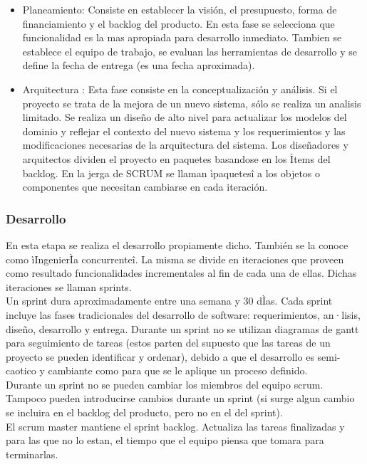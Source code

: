 \documentclass[preprint,12pt]{elsarticle}
\begin{document}
\begin{itemize}
\item Planeamiento: Consiste en establecer la visión, el presupuesto, forma de financiamiento y el backlog del producto. En esta fase se selecciona que funcionalidad es la mas apropiada para desarrollo inmediato. Tambien se establece el equipo de trabajo, se evaluan las herramientas de desarrollo y se define la fecha de entrega (es una fecha aproximada). \cite{ScrumDef}

\item Arquitectura : Esta fase consiste en la conceptualización y análisis. Si el proyecto se trata de la mejora de un nuevo sistema, sólo se realiza un analisis limitado. Se realiza un diseño de alto nivel para actualizar los modelos del dominio y reflejar el contexto del nuevo sistema y los requerimientos y las modificaciones necesarias de la arquitectura del sistema. Los diseñadores y arquitectos dividen el proyecto en paquetes basandose en los Ìtems del backlog. En la jerga de SCRUM se llaman ìpaquetesî a los objetos o componentes que necesitan cambiarse en cada iteración. \cite{ScrumDef}
\end{itemize}

\subsubsection{\textbf{Desarrollo}}
En esta etapa se realiza el desarrollo propiamente dicho. También se la conoce como ìIngenierÌa concurrenteî. La misma se divide en iteraciones que proveen como resultado funcionalidades incrementales al fin de cada una de ellas. Dichas iteraciones se llaman sprints. \\
Un sprint dura aproximadamente entre una semana y 30 dÌas. Cada sprint incluye las fases tradicionales del desarrollo de software: requerimientos, an·lisis, diseño, desarrollo y entrega.
Durante un sprint no se utilizan diagramas de gantt para seguimiento de tareas (estos parten del supuesto que las tareas de un proyecto se pueden identificar y ordenar), debido a que el desarrollo es semi-caotico y cambiante como para que se le aplique un proceso definido. \\
Durante un sprint no se pueden cambiar los miembros del equipo scrum. Tampoco pueden introducirse cambios durante un sprint (si surge algun cambio se incluira en el backlog del producto, pero no en el del sprint). \\
El scrum master mantiene el sprint backlog. Actualiza las tareas finalizadas y para las que no lo estan, el tiempo que el equipo piensa que tomara para terminarlas. \cite{ScrumDef} \\
\end{document}
